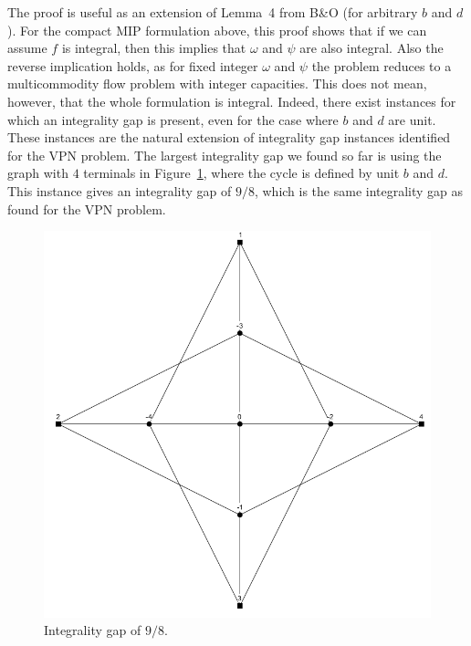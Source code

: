 \documentclass[11pt]{article}
\begin{document}
    The proof is useful as an extension of Lemma~4 from B\&O (for arbitrary $b$ and $d$).
    For the compact MIP formulation above, this proof shows that if we can assume $f$ is integral, then this implies that $\omega$ and $\psi$ are also integral.
    Also the reverse implication holds, as for fixed integer $\omega$ and $\psi$ the problem reduces to a multicommodity flow problem with integer capacities.
    This does not mean, however, that the whole formulation is integral.
    Indeed, there exist instances for which an integrality gap is present, even for the case where $b$ and $d$ are unit.
    These instances are the natural extension of integrality gap instances identified for the VPN problem.
    The largest integrality gap we found so far is using the graph with $4$ terminals in Figure~\ref{fig:gap4}, where the cycle is defined by unit $b$ and $d$.
    This instance gives an integrality gap of $9/8$, which is the same integrality gap as found for the VPN problem.

    \begin{figure}[h]
        \centering
        \includegraphics[width=.45\textwidth]{gap4}
        \caption{Integrality gap of $9/8$.} \label{fig:gap4}
    \end{figure}
\end{document}

